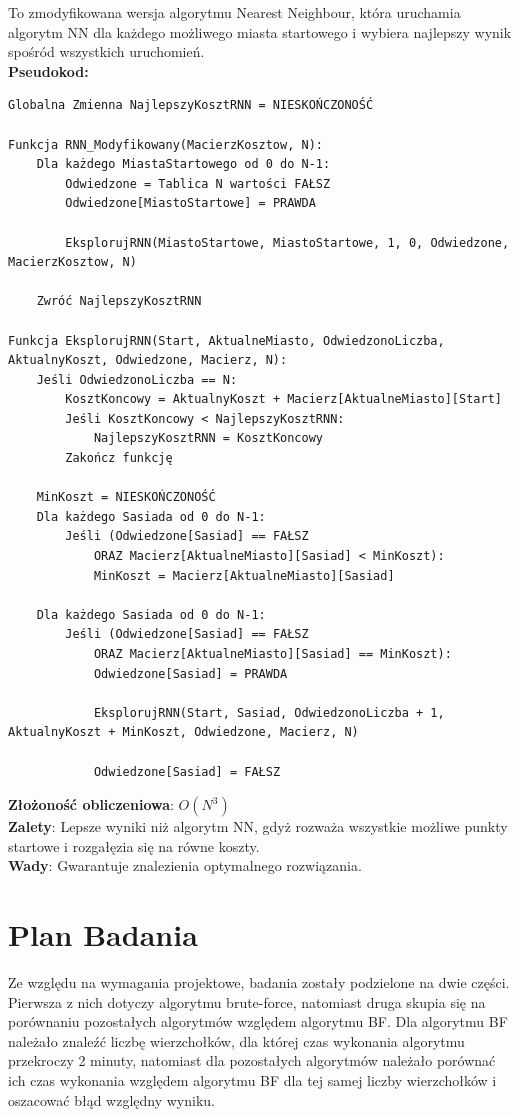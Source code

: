 \documentclass[a4paper,12pt]{article}
\begin{document}
To zmodyfikowana wersja algorytmu Nearest Neighbour, która uruchamia algorytm NN dla każdego możliwego miasta startowego i wybiera najlepszy wynik spośród wszystkich uruchomień. \\
\textbf{Pseudokod:} \\
\begin{verbatim}
Globalna Zmienna NajlepszyKosztRNN = NIESKOŃCZONOŚĆ

Funkcja RNN_Modyfikowany(MacierzKosztow, N):
    Dla każdego MiastaStartowego od 0 do N-1:
        Odwiedzone = Tablica N wartości FAŁSZ
        Odwiedzone[MiastoStartowe] = PRAWDA
        
        EksplorujRNN(MiastoStartowe, MiastoStartowe, 1, 0, Odwiedzone, MacierzKosztow, N)
        
    Zwróć NajlepszyKosztRNN

Funkcja EksplorujRNN(Start, AktualneMiasto, OdwiedzonoLiczba, AktualnyKoszt, Odwiedzone, Macierz, N):
    Jeśli OdwiedzonoLiczba == N:
        KosztKoncowy = AktualnyKoszt + Macierz[AktualneMiasto][Start]
        Jeśli KosztKoncowy < NajlepszyKosztRNN:
            NajlepszyKosztRNN = KosztKoncowy
        Zakończ funkcję
        
    MinKoszt = NIESKOŃCZONOŚĆ
    Dla każdego Sasiada od 0 do N-1:
        Jeśli (Odwiedzone[Sasiad] == FAŁSZ 
            ORAZ Macierz[AktualneMiasto][Sasiad] < MinKoszt):
            MinKoszt = Macierz[AktualneMiasto][Sasiad]
            
    Dla każdego Sasiada od 0 do N-1:
        Jeśli (Odwiedzone[Sasiad] == FAŁSZ 
            ORAZ Macierz[AktualneMiasto][Sasiad] == MinKoszt):
            Odwiedzone[Sasiad] = PRAWDA
            
            EksplorujRNN(Start, Sasiad, OdwiedzonoLiczba + 1, AktualnyKoszt + MinKoszt, Odwiedzone, Macierz, N)
            
            Odwiedzone[Sasiad] = FAŁSZ
\end{verbatim}
\textbf{Złożoność obliczeniowa}: $O(N^3)$ \\
\textbf{Zalety}: Lepsze wyniki niż algorytm NN,
gdyż rozważa wszystkie możliwe punkty startowe i rozgałęzia się na równe koszty. \\
\textbf{Wady}: Gwarantuje znalezienia optymalnego rozwiązania.
\section{Plan Badania}

Ze względu na wymagania projektowe, badania zostały podzielone na dwie części. Pierwsza z nich dotyczy algorytmu brute-force, natomiast druga skupia się na porównaniu 
pozostałych algorytmów względem algorytmu BF.
Dla algorytmu BF należało znaleźć liczbę wierzchołków, dla której czas wykonania algorytmu przekroczy 2 minuty,
natomiast dla pozostałych algorytmów należało porównać ich czas wykonania względem algorytmu BF dla tej samej liczby wierzchołków i oszacować błąd względny wyniku.
\end{document}
